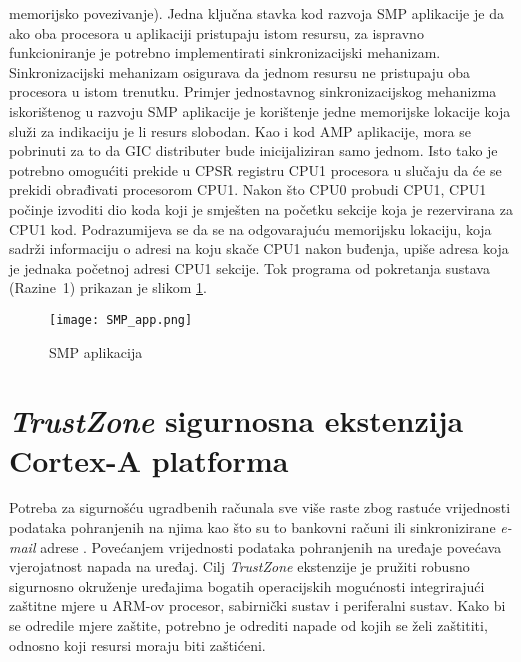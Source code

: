 \documentclass[times, utf8, diplomski, numeric]{fer}
\begin{document}
memorijsko povezivanje). Jedna ključna stavka kod razvoja SMP aplikacije je da ako oba procesora u aplikaciji pristupaju
istom resursu, za ispravno funkcioniranje je potrebno implementirati sinkronizacijski mehanizam. Sinkronizacijski mehanizam
osigurava da jednom resursu ne pristupaju oba procesora u istom trenutku. Primjer jednostavnog sinkronizacijskog mehanizma
iskorištenog u razvoju SMP aplikacije je korištenje jedne memorijske lokacije koja služi za indikaciju je li resurs slobodan.
Kao i kod AMP aplikacije, mora se pobrinuti za to da GIC distributer bude inicijaliziran samo jednom. Isto tako je potrebno
omogućiti prekide u CPSR registru CPU1 procesora u slučaju da će se prekidi obrađivati procesorom CPU1. Nakon što CPU0
probudi CPU1, CPU1 počinje izvoditi dio koda koji je smješten na početku sekcije koja je rezervirana za CPU1 kod.
Podrazumijeva se da se na odgovarajuću memorijsku lokaciju, koja sadrži informaciju o adresi na koju skače CPU1 nakon buđenja,
upiše adresa koja je jednaka početnoj adresi CPU1 sekcije. Tok programa od pokretanja sustava (Razine~1) prikazan je slikom
\ref{smp_app}.
\begin{figure}[H]
  \centering
	\texttt{[image: SMP\_app.png]}%
	\caption{SMP aplikacija}
	\label{smp_app}%
\end{figure}

\chapter{\textit{TrustZone} sigurnosna ekstenzija Cortex-A platforma}
Potreba za sigurnošću ugradbenih računala sve više raste zbog rastuće vrijednosti podataka pohranjenih na njima kao
što su to bankovni računi ili sinkronizirane \textit{e-mail} adrese \cite{tz_wp}. Povećanjem vrijednosti podataka pohranjenih na
uređaje povećava vjerojatnost napada na uređaj. Cilj \textit{TrustZone} ekstenzije je pružiti robusno sigurnosno okruženje
uređajima bogatih operacijskih mogućnosti integrirajući zaštitne mjere u ARM-ov procesor, sabirnički sustav i periferalni
sustav. Kako bi se odredile mjere zaštite, potrebno je odrediti napade od kojih se želi zaštititi, odnosno koji resursi
moraju biti zaštićeni.
\end{document}
